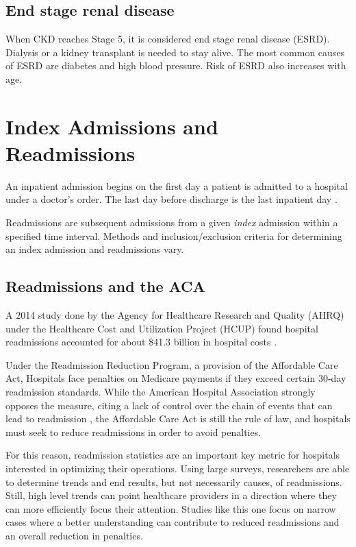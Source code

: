 \documentclass[12pt]{ociamthesis}\usepackage[]{graphicx}\usepackage[]{color}
\begin{document}
\subsection{End stage renal disease}

When CKD reaches Stage 5, it is considered end stage renal disease (ESRD). Dialysis or a kidney transplant is needed to stay alive.
The most common causes of ESRD are diabetes and high blood pressure. Risk of ESRD also increases with age. 


\section{Index Admissions and Readmissions}

An inpatient admission begins on the first day a patient is admitted to a hospital under a doctor's order. The 
last day before discharge is the last inpatient day \cite{Medicare}.

Readmissions are subsequent admissions from a given \textit{index} admission within a specified time interval.
Methods and inclusion/exclusion criteria for determining an index admission and readmissions vary. 

\subsection{Readmissions and the ACA}

A 2014 study done by the Agency for Healthcare Research and Quality (AHRQ) under the Healthcare Cost and Utilization
Project (HCUP) found hospital readmissions accounted for about \$41.3 billion in hospital costs \cite{Hines2014}.

Under the Readmission Reduction Program, a provision of the Affordable Care Act, 
Hospitals face penalties on Medicare payments if they exceed certain 30-day readmission standards. While the 
American Hospital Association strongly opposes the measure, citing a lack of control over the chain of events
that can lead to readmission \cite{Rice2015, AHA2018}, the Affordable Care Act is still the rule of law, and hospitals must seek
to reduce readmissions in order to avoid penalties.

For this reason, readmission statistics are an important key metric for hospitals interested in optimizing 
their operations. Using large surveys, researchers are able to determine trends and end results, but not necessarily 
causes, of readmissions. Still, high level trends can point healthcare providers in a direction where they can
more efficiently focus their attention. Studies like this one focus on narrow cases where a better understanding can 
contribute to reduced readmissions and an overall reduction in penalties.
\end{document}
